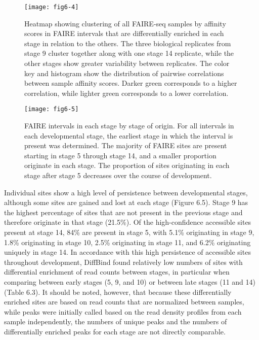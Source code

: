 \begin{figure}
\centering
\texttt{[image: fig6-4]}
\caption[Clustering of all FAIRE-seq samples by affinity scores in FAIRE intervals that are differentially enriched in each stage in relation to the others]{Heatmap showing clustering of all FAIRE-seq samples by affinity scores in FAIRE intervals that are differentially enriched in each stage in relation to the others. The three biological replicates from stage 9 cluster together along with one stage 14 replicate, while the other stages show greater variability between replicates. The color key and histogram show the distribution of pairwise correlations between sample affinity scores. Darker green corresponds to a higher correlation, while lighter green corresponds to a lower correlation.}
\label{Figure 6.4}
\end{figure}

\begin{figure}
\centering
\texttt{[image: fig6-5]}
\caption[FAIRE intervals in each stage by stage of origin]{FAIRE intervals in each stage by stage of origin. For all intervals in each developmental stage, the earliest stage in which the interval is present was determined. The majority of FAIRE sites are present starting in stage 5 through stage 14, and a smaller proportion originate in each stage. The proportion of sites originating in each stage after stage 5 decreases over the course of development.}
\label{Figure 6.5}
\end{figure} 

Individual sites show a high level of persistence between developmental stages, although some sites are gained and lost at each stage (Figure 6.5). Stage 9 has the highest percentage of sites that are not present in the previous stage and therefore originate in that stage (21.5\%). Of the high-confidence accessible sites present at stage 14, 84\% are present in stage 5, with 5.1\% originating in stage 9, 1.8\% originating in stage 10, 2.5\% originating in stage 11, and 6.2\% originating uniquely in stage 14. In accordance with this high persistence of accessible sites throughout development, DiffBind found relatively low numbers of sites with differential enrichment of read counts between stages, in particular when comparing between early stages (5, 9, and 10) or between late stages (11 and 14) (Table 6.3). It should be noted, however, that because these differentially enriched sites are based on read counts that are normalized between samples, while peaks were initially called based on the read density profiles from each sample independently, the numbers of unique peaks and the numbers of differentially enriched peaks for each stage are not directly comparable.

